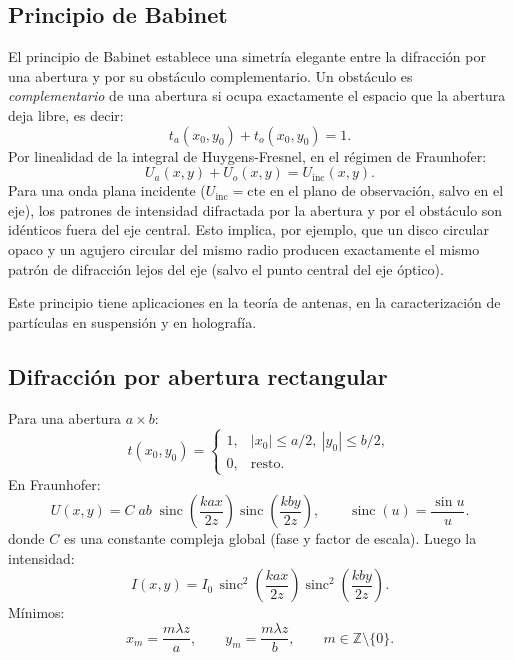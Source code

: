 \documentclass[12pt, a4paper]{article}
\theoremstyle{plain}
\theoremstyle{definition}
\theoremstyle{remark}
\begin{document}
\subsection{Principio de Babinet}

El principio de Babinet establece una simetría elegante entre la difracción
por una abertura y por su obstáculo complementario. Un obstáculo es
\emph{complementario} de una abertura si ocupa exactamente el espacio que
la abertura deja libre, es decir:
\begin{equation}
  t_a(x_0,y_0)+t_o(x_0,y_0)=1.
  \label{eq:babinet_transmision_t5}
\end{equation}
Por linealidad de la integral de Huygens-Fresnel, en el régimen de Fraunhofer:
\[
  U_a(x,y)+U_o(x,y)=U_{\text{inc}}(x,y).
\]
Para una onda plana incidente ($U_{\text{inc}} = \mathrm{cte}$ en el plano de
observación, salvo en el eje), los patrones de intensidad difractada por la
abertura y por el obstáculo son idénticos fuera del eje central. Esto implica,
por ejemplo, que un disco circular opaco y un agujero circular del mismo
radio producen exactamente el mismo patrón de difracción lejos del eje (salvo
el punto central del eje óptico).

Este principio tiene aplicaciones en la teoría de antenas, en la caracterización
de partículas en suspensión y en holografía.

\subsection{Difracción por abertura rectangular}

Para una abertura $a\times b$:
\[
  t(x_0,y_0)=
  \begin{cases}
    1, & |x_0|\le a/2,\ |y_0|\le b/2,\\
    0, & \text{resto.}
  \end{cases}
\]
En Fraunhofer:
\begin{equation}
  U(x,y)=C\;ab\;
  \operatorname{sinc}\!\left(\frac{kax}{2z}\right)
  \operatorname{sinc}\!\left(\frac{kby}{2z}\right),
  \qquad
  \operatorname{sinc}(u)=\frac{\sin u}{u}.
  \label{eq:rect_amplitud_t5}
\end{equation}
donde $C$ es una constante compleja global (fase y factor de escala).
Luego la intensidad:
\begin{equation}
  I(x,y)=I_0\,
  \operatorname{sinc}^2\!\left(\frac{kax}{2z}\right)
  \operatorname{sinc}^2\!\left(\frac{kby}{2z}\right).
  \label{eq:rect_intensidad_t5}
\end{equation}
Mínimos:
\begin{equation}
  x_m=\frac{m\lambda z}{a},\qquad
  y_m=\frac{m\lambda z}{b},
  \qquad m\in\mathbb{Z}\setminus\{0\}.
  \label{eq:rect_minimos_t5}
\end{equation}
\end{document}
